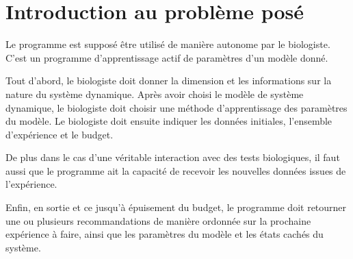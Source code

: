 \documentclass{report}
\begin{document}
\chapter{Introduction au problème posé}
Le programme est supposé être utilisé de manière autonome par le biologiste. C'est un programme d'apprentissage actif de paramètres d'un modèle donné.
\begin{tabbing}\end{tabbing}Tout d'abord, le biologiste doit donner la dimension et les informations sur la nature du système dynamique. Après avoir choisi le modèle de système dynamique, le biologiste doit choisir une méthode d'apprentissage des paramètres du modèle. Le biologiste doit ensuite indiquer les données initiales, l'ensemble d'expérience et le budget. 
\begin{tabbing}\end{tabbing}De plus dans le cas d'une véritable interaction avec des tests biologiques, il faut aussi que le programme ait la capacité de recevoir les nouvelles données issues de l'expérience.
\begin{tabbing}\end{tabbing}Enfin, en sortie et ce jusqu'à épuisement du budget, le programme doit retourner une ou plusieurs recommandations de manière ordonnée sur la prochaine expérience à faire, ainsi que les paramètres du modèle et les états cachés du système.
\end{document}
